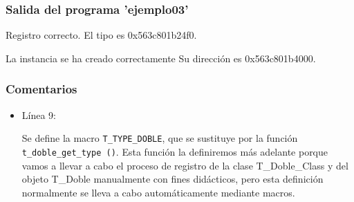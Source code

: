  \subsubsection{Salida del programa 'ejemplo03'}
\textsf{Registro correcto. El tipo es 0x563c801b24f0.}\par
\textsf{La instancia se ha creado correctamente Su dirección es 0x563c801b4000.}\par

\subsubsection{Comentarios}
\begin{itemize}
\item Línea 9:\par
  Se define la macro \texttt{T\_TYPE\_DOBLE}, que se sustituye por la función
  \texttt{t\_doble\_get\_type ()}. Esta función la definiremos más adelante porque vamos a llevar a cabo
  el proceso de registro de la clase \textsf{T\_Doble\_Class} y del objeto \textsf{T\_Doble} manualmente
  con fines didácticos,  pero esta definición normalmente se lleva a cabo automáticamente mediante macros.
  

\end{itemize}
